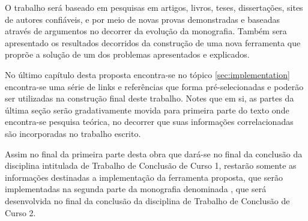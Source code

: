 {    O trabalho será baseado em pesquisas em artigos, livros, teses,
    dissertações, sites de autores confiáveis, e por meio de novas provas
    demonstradas e baseadas através de argumentos no decorrer da evolução da
    monografia. Também sera apresentado os resultados decorridos da construção
    de uma nova ferramenta que proprõe a solução de um dos problemas
    apresentados e explicados.

    No último capítulo desta proposta encontra-se no tópico
    \autoref{sec:implementation} encontra-se uma série de links e referências
    que forma pré-selecionadas e poderão ser utilizadas na construção final
    deste trabalho. Notes que em si, as partes da última seção serão
    gradativamente movida para primeira parte do texto onde encontra-se pesquisa
    teórica, no decorrer que suas informações correlacionadas são incorporadas
    no trabalho escrito.

    Assim no final da primeira parte desta obra que dará-se no final da
    conclusão da disciplina intitulada de Trabalho de Conclusão de Curso 1,
    restarão somente as informações destinadas a implementação da ferramenta
    proposta, que serão implementadas na segunda parte da monografia denominada
    , que será desenvolvida no final da conclusão da
    disciplina de Trabalho de Conclusão de Curso 2.
}


